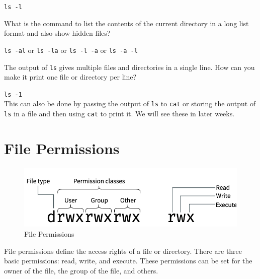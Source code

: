 \begin{ans}
\texttt{ls -l}
\end{ans}

\begin{qs}
  What is the command to list the contents of the current directory
  in a long list format and also show hidden files?
\end{qs}

\begin{ans}
\texttt{ls -al} or \texttt{ls -la} or \texttt{ls -l -a} or \texttt{ls -a -l}
\end{ans}

\begin{qs}
  The output of \texttt{ls} gives multiple files and directories in a single
  line. How can you make it print one file or directory per line?
\end{qs}

\begin{ans}
  \texttt{ls -1}\\
  This can also be done by passing the output of \texttt{ls} to \texttt{cat}
  or storing the output of \texttt{ls} in a file and then using \texttt{cat}
  to print it. We will see these in later weeks.
\end{ans}

\vfill
\pagebreak
\section{File Permissions}

\begin{figure}[hb]
  \includegraphics{images/png/perms.png}
  \caption[File Permissions]{File Permissions}
\end{figure}

\begin{definition}
  File permissions define the access rights of a file or directory.
  There are three basic permissions: read, write, and execute.
  These permissions can be set for the owner of the file, the group of the file, and others.
\end{definition}

